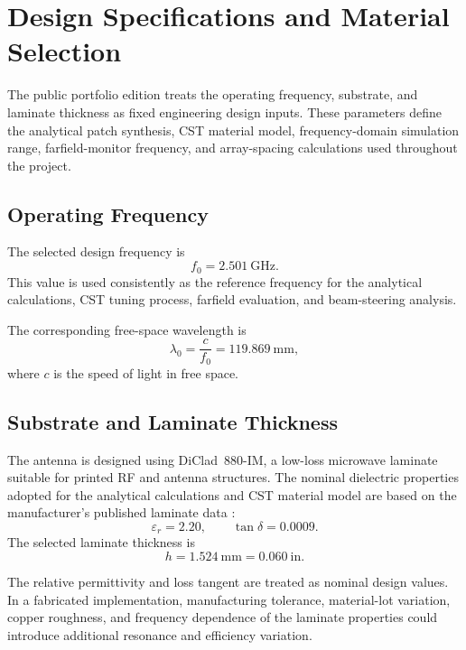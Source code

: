 
\section{Design Specifications and Material Selection}
\label{sec:design-specifications}

The public portfolio edition treats the operating frequency, substrate, and laminate thickness as
fixed engineering design inputs. These parameters define the analytical patch synthesis, CST
material model, frequency-domain simulation range, farfield-monitor frequency, and array-spacing
calculations used throughout the project.

\subsection{Operating Frequency}

The selected design frequency is
\[
f_0 = 2.501~\text{GHz}.
\]
This value is used consistently as the reference frequency for the analytical calculations, CST
tuning process, farfield evaluation, and beam-steering analysis.

The corresponding free-space wavelength is
\[
\lambda_0
=
\frac{c}{f_0}
=
119.869~\text{mm},
\]
where \(c\) is the speed of light in free space.

\subsection{Substrate and Laminate Thickness}

The antenna is designed using DiClad~880-IM, a low-loss microwave laminate suitable for printed
RF and antenna structures. The nominal dielectric properties adopted for the analytical calculations
and CST material model are based on the manufacturer's published laminate data
\cite{rogers_diclad870_880}:
\[
\varepsilon_r = 2.20,
\qquad
\tan\delta = 0.0009.
\]
The selected laminate thickness is
\[
h = 1.524~\text{mm} = 0.060~\text{in}.
\]

The relative permittivity and loss tangent are treated as nominal design values. In a fabricated
implementation, manufacturing tolerance, material-lot variation, copper roughness, and frequency
dependence of the laminate properties could introduce additional resonance and efficiency variation.

